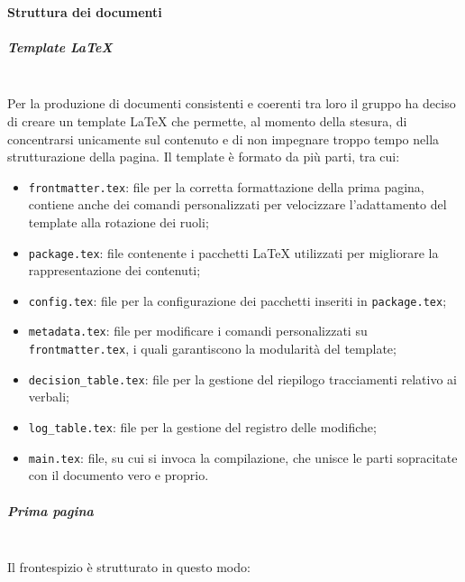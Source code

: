         \paragraph{Struttura dei documenti}
        \setlength{\parindent}{0cm}
            \subparagraph{Template \LaTeX}\mbox{}\\ [1mm]
                Per la produzione di documenti consistenti e coerenti tra loro il gruppo ha deciso di creare un template \LaTeX \xspace che permette, al momento della stesura, di concentrarsi unicamente sul contenuto e di non impegnare troppo tempo nella strutturazione della pagina. Il template è formato da
                più parti, tra cui:
                \begin{itemize}
                    \item \verb|frontmatter.tex|: file per la corretta formattazione della prima pagina, contiene anche dei comandi personalizzati per velocizzare l'adattamento del template alla rotazione dei ruoli;
                    \item \verb|package.tex|: file contenente i pacchetti \LaTeX \xspace utilizzati per migliorare la rappresentazione dei contenuti;
                    \item \verb|config.tex|: file per la configurazione dei pacchetti inseriti in \verb|package.tex|;
                    \item \verb|metadata.tex|: file per modificare i comandi personalizzati su \verb|frontmatter.tex|, i quali garantiscono la modularità del template;
                    \item \verb|decision_table.tex|: file per la gestione del riepilogo tracciamenti relativo ai verbali;
                    \item \verb|log_table.tex|: file per la gestione del registro delle modifiche;
                    \item \verb|main.tex|: file, su cui si invoca la compilazione, che unisce le parti sopracitate con il documento vero e proprio.
                \end{itemize}
            \subparagraph{Prima pagina}\mbox{}\\ [1mm]
                Il frontespizio è strutturato in questo modo:
